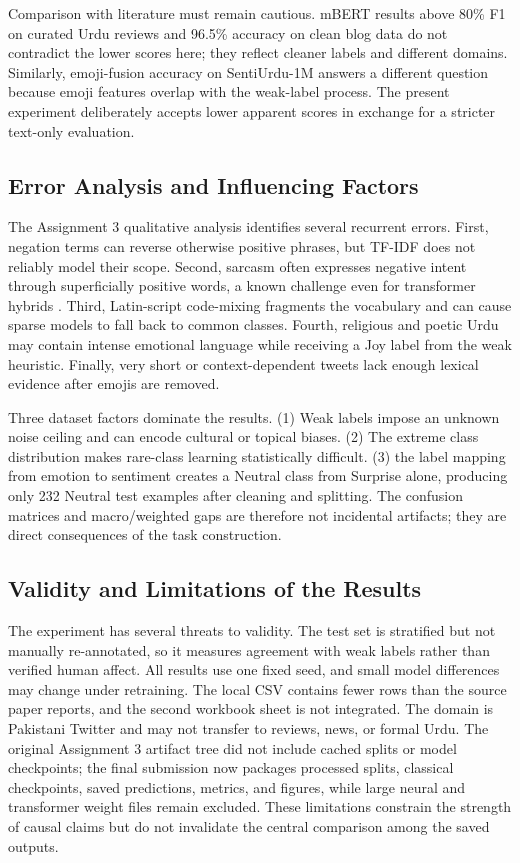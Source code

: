 \documentclass[conference]{IEEEtran}
\begin{document}
Comparison with literature must remain cautious. mBERT results above 80\% F1 on curated Urdu reviews \cite{khan2022multiclass} and 96.5\% accuracy on clean blog data \cite{saeed2024indepth} do not contradict the lower scores here; they reflect cleaner labels and different domains. Similarly, emoji-fusion accuracy on SentiUrdu-1M \cite{narejo2024emoji} answers a different question because emoji features overlap with the weak-label process. The present experiment deliberately accepts lower apparent scores in exchange for a stricter text-only evaluation.

\subsection{Error Analysis and Influencing Factors}

The Assignment 3 qualitative analysis identifies several recurrent errors. First, negation terms can reverse otherwise positive phrases, but TF-IDF does not reliably model their scope. Second, sarcasm often expresses negative intent through superficially positive words, a known challenge even for transformer hybrids \cite{hassan2024sarcasm}. Third, Latin-script code-mixing fragments the vocabulary and can cause sparse models to fall back to common classes. Fourth, religious and poetic Urdu may contain intense emotional language while receiving a Joy label from the weak heuristic. Finally, very short or context-dependent tweets lack enough lexical evidence after emojis are removed.

Three dataset factors dominate the results. (1) Weak labels impose an unknown noise ceiling and can encode cultural or topical biases. (2) The extreme class distribution makes rare-class learning statistically difficult. (3) the label mapping from emotion to sentiment creates a Neutral class from Surprise alone, producing only 232 Neutral test examples after cleaning and splitting. The confusion matrices and macro/weighted gaps are therefore not incidental artifacts; they are direct consequences of the task construction.

\subsection{Validity and Limitations of the Results}

The experiment has several threats to validity. The test set is stratified but not manually re-annotated, so it measures agreement with weak labels rather than verified human affect. All results use one fixed seed, and small model differences may change under retraining. The local CSV contains fewer rows than the source paper reports, and the second workbook sheet is not integrated. The domain is Pakistani Twitter and may not transfer to reviews, news, or formal Urdu. The original Assignment 3 artifact tree did not include cached splits or model checkpoints; the final submission now packages processed splits, classical checkpoints, saved predictions, metrics, and figures, while large neural and transformer weight files remain excluded. These limitations constrain the strength of causal claims but do not invalidate the central comparison among the saved outputs.
\end{document}

